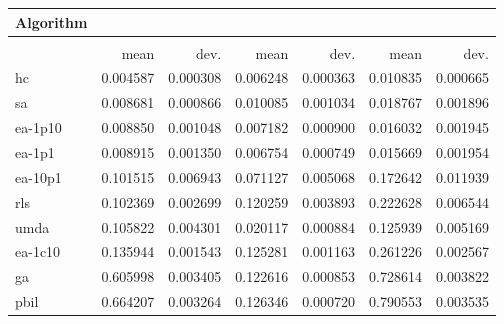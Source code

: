 \begin{tabular}{@{} l *{6}{>{{}}N{1}{2}} @{}}
\toprule
{Algorithm} &  \\
\midrule
&  &  &  \\
\midrule
& {mean} & {dev.} & {mean} & {dev.} & {mean} & {dev.} \\
\midrule
hc & 0.004587 & 0.000308 & 0.006248 & 0.000363 & 0.010835 & 0.000665 \\
sa & 0.008681 & 0.000866 & 0.010085 & 0.001034 & 0.018767 & 0.001896 \\
ea-1p10 & 0.008850 & 0.001048 & 0.007182 & 0.000900 & 0.016032 & 0.001945 \\
ea-1p1 & 0.008915 & 0.001350 & 0.006754 & 0.000749 & 0.015669 & 0.001954 \\
ea-10p1 & 0.101515 & 0.006943 & 0.071127 & 0.005068 & 0.172642 & 0.011939 \\
rls & 0.102369 & 0.002699 & 0.120259 & 0.003893 & 0.222628 & 0.006544 \\
umda & 0.105822 & 0.004301 & 0.020117 & 0.000884 & 0.125939 & 0.005169 \\
ea-1c10 & 0.135944 & 0.001543 & 0.125281 & 0.001163 & 0.261226 & 0.002567 \\
ga & 0.605998 & 0.003405 & 0.122616 & 0.000853 & 0.728614 & 0.003822 \\
pbil & 0.664207 & 0.003264 & 0.126346 & 0.000720 & 0.790553 & 0.003535 \\
\bottomrule
\end{tabular}

